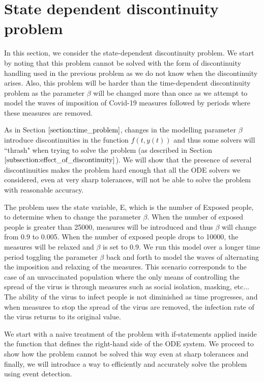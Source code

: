 
\section{State dependent discontinuity problem}
In this section, we consider the state-dependent discontinuity problem. We start by noting that this problem cannot be solved with the form of discontinuity handling used in the previous problem as we do not know when the discontinuity arises. Also, this problem will be harder than the time-dependent discontinuity problem as the parameter $\beta$ will be changed more than once as we attempt to model the waves of imposition of Covid-19 measures followed by periods where these measures are removed. 

As in Section $\ref{section:time_problem}$, changes in the modelling parameter $\beta$ introduce discontinuities in the function $f(t, y(t))$ and thus some solvers will ``thrash" when trying to solve the problem (as described in Section $\ref{subsection:effect_of_discontinuity}$). We will show that the presence of several discontinuities makes the problem hard enough that all the ODE solvers we considered, even at very sharp tolerances, will not be able to solve the problem with reasonable accuracy.

The problem uses the state variable, E, which is the number of Exposed people, to determine when to change the parameter $\beta$. When the number of exposed people is greater than 25000, measures will be introduced and thus $\beta$ will change from 0.9 to 0.005. When the number of exposed people drops to 10000, the measures will be relaxed and $\beta$ is set to 0.9. We run this model over a longer time period toggling the parameter $\beta$ back and forth to model the waves of alternating the imposition and relaxing of the measures. This scenario corresponds to the case of an unvaccinated population where the only means of controlling the spread of the virus is through measures such as social isolation, masking, etc... The ability of the virus to infect people is not diminished as time progresses, and when measures to stop the spread of the virus are removed, the infection rate of the virus returns to its original value.

We start with a naive treatment of the problem with if-statements applied inside the function that defines the right-hand side of the ODE system. We proceed to show how the problem cannot be solved this way even at sharp tolerances and finally, we will introduce a way to efficiently and accurately solve the problem using event detection.

